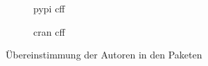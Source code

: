 
\begin{figure}
    \begin{subfigure}{.5\textwidth}
        \centering
        
        \caption{\gls{pypi} \gls{cff}}
        \label{fig:similarity_pypi_cff}
    \end{subfigure}%
    \begin{subfigure}{.5\textwidth}
        \centering
        
        \caption{\gls{cran} \gls{cff}}
        \label{fig:similarity_cran_cff}
    \end{subfigure}
    \caption{Übereinstimmung der Autoren in den Paketen}
    \label{fig:similarities}
    \small
    \raggedright
\end{figure}

